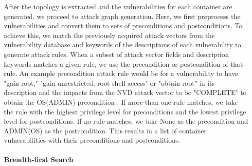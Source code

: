 After the topology is extracted and the vulnerabilities for each container are generated, we proceed to attack graph generation. Here, we first preprocess the vulnerabilities and convert them to sets of preconditions and postconditions. To achieve this, we match the previously acquired attack vectors from the vulnerability database and keywords of the descriptions of each vulnerability to generate attack rules. When a subset of attack vector fields and description keywords matches a given rule, we use the precondition or postcondition of that rule. An example precondition attack rule would be for a vulnerability to have "gain root," "gain unrestricted, root shell access" or "obtain root" in its description and the impacts from the NVD attack vector \cite{booth2013national} to be "COMPLETE" to obtain the OS(ADMIN) precondition \cite{aksu2018automated}. If more than one rule matches, we take the rule with the highest privilege level for preconditions and the lowest privilege level for postconditions. If no rule matches, we take None as the precondition and ADMIN(OS) as the postcondition. This results in a list of container vulnerabilities with their preconditions and postconditions.

\paragraph{Breadth-first Search}
\label{chap:bfs}

